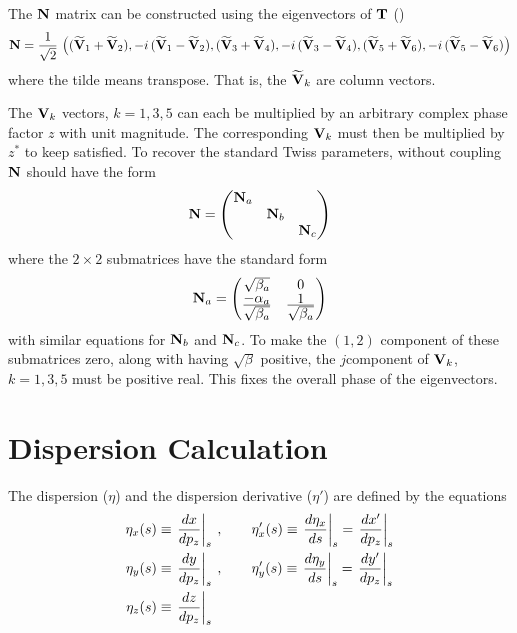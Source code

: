 The ${\bf N}$ matrix can be constructed using the eigenvectors of ${\bf T}$ ()
\begin{equation}
  {\bf N} = \frac{1}{\sqrt{2}} \, \left( 
    (\widetilde{{\bf V}}_1 + \widetilde{{\bf V}}_2), -i \, (\widetilde{{\bf V}}_1 - \widetilde{{\bf V}}_2), 
    (\widetilde{{\bf V}}_3 + \widetilde{{\bf V}}_4), -i \, (\widetilde{{\bf V}}_3 - \widetilde{{\bf V}}_4), 
    (\widetilde{{\bf V}}_5 + \widetilde{{\bf V}}_6), -i \, (\widetilde{{\bf V}}_5 - \widetilde{{\bf V}}_6)
  \right)
\end{equation}
where the tilde means transpose. That is, the $\widetilde{{\bf V}}_k$ are column vectors.

The ${\bf V}_k$ vectors, $k = 1, 3, 5$ can each be multiplied by an arbitrary complex phase factor $z$
with unit magnitude. The corresponding ${\bf V}_k$ must then be multiplied by $z^*$
to keep  satisfied. To recover the standard Twiss parameters, without coupling ${\bf N}$
should have the form
\begin{equation}
  {\bf N} = \begin{pmatrix}
    {\bf N}_a &        &        \\
           & {\bf N}_b &        \\
           &        & {\bf N}_c
  \end{pmatrix}
\end{equation}
where the $2 \times 2$ submatrices have the standard form
\begin{equation}
  {\bf N}_a = \begin{pmatrix}
    \sqrt{\beta_a}                                   & 0 \cr
    \frac{\textstyle -\alpha_a}{\textstyle \sqrt{\beta_a}} & \frac{\textstyle 1}{\textstyle \sqrt{\beta_a}}
  \end{pmatrix}
\end{equation}
with similar equations for ${\bf N}_b$ and ${\bf N}_c$. To make the $(1,2)$ component of these submatrices
zero, along with having $\sqrt{\beta}$ positive, the $j$\Th component of ${\bf V}_k$, $k = 1, 3, 5$
must be positive real. This fixes the overall phase of the eigenvectors.

\section{Dispersion Calculation}
\label{s:dispersion}

The dispersion ($\eta$) and the dispersion derivative ($\eta'$) are defined by the equations
\begin{align}
  \eta_x(s) &\equiv \left. \frac{dx}{dp_z} \right|_s \> , \qquad
    \eta'_x(s) \equiv \left. \frac{d\eta_x}{ds} \right|_s
    = \left. \frac{dx'}{dp_z} \right|_s \nonumber \\
  \eta_y(s) &\equiv \left. \frac{dy}{dp_z} \right|_s \> , \qquad
    \eta'_y(s) \equiv \left. \frac{d\eta_y}{ds} \right|_s
    = \left. \frac{dy'}{dp_z} \right|_s \\
  \eta_z(s) &\equiv \left. \frac{dz}{dp_z} \right|_s \nonumber
\end{align}

